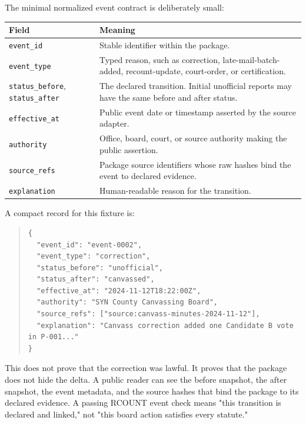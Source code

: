 The minimal normalized event contract is deliberately small:
\begin{center}
\small
\begin{tabularx}{\textwidth}{lX}
\toprule
Field & Meaning \\
\midrule
\texttt{event\_id} & Stable identifier within the package. \\
\texttt{event\_type} & Typed reason, such as correction, late-mail-batch-added, recount-update, court-order, or certification. \\
\texttt{status\_before}, \texttt{status\_after} & The declared transition. Initial unofficial reports may have the same before and after status. \\
\texttt{effective\_at} & Public event date or timestamp asserted by the source adapter. \\
\texttt{authority} & Office, board, court, or source authority making the public assertion. \\
\texttt{source\_refs} & Package source identifiers whose raw hashes bind the event to declared evidence. \\
\texttt{explanation} & Human-readable reason for the transition. \\
\bottomrule
\end{tabularx}
\end{center}

A compact record for this fixture is:
\begin{quote}
\footnotesize
\begin{verbatim}
{
  "event_id": "event-0002",
  "event_type": "correction",
  "status_before": "unofficial",
  "status_after": "canvassed",
  "effective_at": "2024-11-12T18:22:00Z",
  "authority": "SYN County Canvassing Board",
  "source_refs": ["source:canvass-minutes-2024-11-12"],
  "explanation": "Canvass correction added one Candidate B vote in P-001..."
}
\end{verbatim}
\end{quote}

This does not prove that the correction was lawful. It proves that the package
does not hide the delta. A public reader can see the before snapshot, the after
snapshot, the event metadata, and the source hashes that bind the package to its
declared evidence. A passing RCOUNT event check means "this transition is
declared and linked," not "this board action satisfies every statute."
